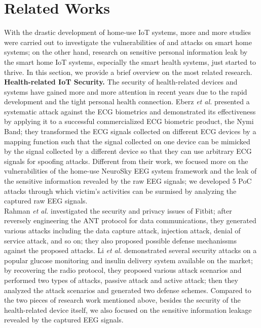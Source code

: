 \section{Related Works}
\label{sec:related}
With the drastic development of home-use IoT systems, more and more studies were carried out to investigate the vulnerabilities of and attacks on smart home systems; on the other hand, research on sensitive personal information leak by the smart home IoT systems, especially the smart health systems, just started to thrive. In this section, we provide a brief overview on the most related research.\\
%
\indent \textbf{Health-related IoT Security.}
The security of health-related devices and systems have gained more and more attention in recent years due to the rapid development and the tight personal health connection. Eberz \emph{et al.} \cite{eberz2017broken} presented a systematic attack against the ECG biometrics and demonstrated its effectiveness by applying it to a successful commercialized ECG biometric product, the Nymi Band; they transformed the ECG signals collected on different ECG devices by a mapping function such that the signal collected on one device can be mimicked by the signal collected by a different device so that they can use arbitrary ECG signals for spoofing attacks. Different from their work, we focused more on the vulnerabilities of the home-use NeuroSky EEG system framework and the leak of the sensitive information revealed by the raw EEG signals; we developed 5 PoC attacks through which victim's activities can be surmised by analyzing the captured raw EEG signals.\\
\indent Rahman \emph{et al.} \cite{rahman2013fit} investigated the security and privacy issues of Fitbit; after reversely engineering the ANT protocol for data communications, they generated various attacks including the data capture attack, injection attack, denial of service attack, and so on; they also proposed possible defense mechanissms against the proposed attacks. Li \emph{et al.} \cite{li2011hijacking} demonstrated several security attacks on a popular glucose monitoring and insulin delivery system available on the market; by recovering the radio protocol, they proposed various attack scenarios and performed two types of attacks, passive attack and active attack; then they analyzed the attack scenarios and generated two defense schemes. Compared to the two pieces of research work mentioned above, besides the security of the health-related device itself, we also focused on the sensitive information leakage revealed by the captured EEG signals.\\

